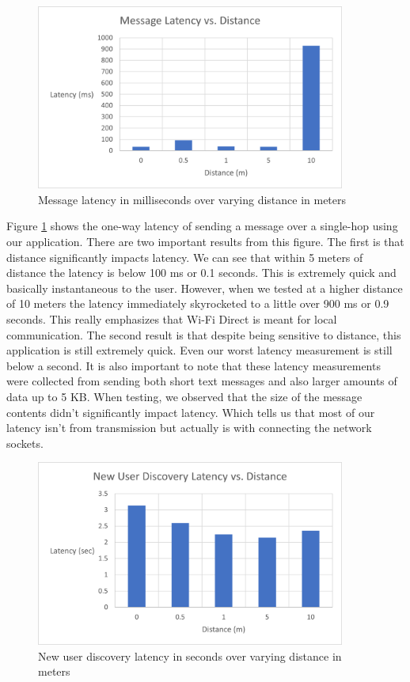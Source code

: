 \documentclass[10pt]{article}
\begin{document}
\begin{figure}[h!]
    \centering
    \includegraphics[width=4in]{message_latency_graph.png}
    \caption{Message latency in milliseconds over varying distance in meters}
    \label{results:message_latency}
\end{figure}

Figure \ref{results:message_latency} shows the one-way latency of sending a message over a single-hop using our application. There are two important results from this figure. The first is that distance significantly impacts latency. We can see that within 5 meters of distance the latency is below 100 ms or 0.1 seconds. This is extremely quick and basically instantaneous to the user. However, when we tested at a higher distance of 10 meters the latency immediately skyrocketed to a little over 900 ms or 0.9 seconds. This really emphasizes that Wi-Fi Direct is meant for local communication. The second result is that despite being sensitive to distance, this application is still extremely quick. Even our worst latency measurement is still below a second. It is also important to note that these latency measurements were collected from sending both short text messages and also larger amounts of data up to 5 KB. When testing, we observed that the size of the message contents didn't significantly impact latency. Which tells us that most of our latency isn't from transmission but actually is with connecting the network sockets.

\begin{figure}[h!]
    \centering
    \includegraphics[width=4in]{new_user_dicovery_graph.png}
    \caption{New user discovery latency in seconds over varying distance in meters}
    \label{results:new_user}
\end{figure}
\end{document}
